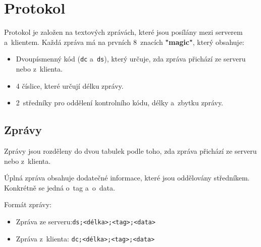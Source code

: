 \documentclass[12pt, a4paper]{article}
\begin{document}
\newpage

\section{Protokol}
Protokol je založen na textových zprávách, které jsou posílány mezi serverem a~klientem.
Každá zpráva má na prvních 8~znacích \textbf{"magic"}, který obsahuje:
\begin{itemize}
    \item Dvoupísmenný kód (\texttt{dc} a~\texttt{ds}), který určuje, zda zpráva přichází ze serveru nebo z~klienta.
    \item 4 číslice, které určují délku zprávy.
    \item 2~středníky pro oddělení kontrolního kódu, délky a~zbytku zprávy.
\end{itemize}

\subsection{Zprávy}
Zprávy jsou rozděleny do dvou tabulek podle toho, zda zpráva přichází ze serveru nebo z~klienta.

Úplná zpráva obsahuje dodatečné informace, které jsou oddělovány středníkem.
Konkrétně se jedná o~tag a~o~data.

Formát zprávy:
\begin{itemize}
    \item Zpráva ze serveru:\texttt{ds;<délka>;<tag>;<data>}
    \item Zpráva z~klienta: \texttt{dc;<délka>;<tag>;<data>}
\end{itemize}
\end{document}
